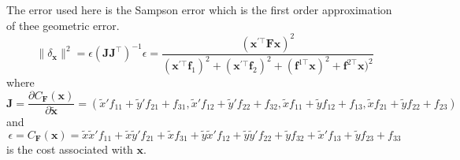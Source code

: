 \documentclass{../../assignment}
\begin{document}
\begin{problemlist}
\begin{enumerate}
The error used here is the Sampson error which is the first order approximation of thee geometric error.
$$
\|\delta_\mathbf{x}\|^2 = \epsilon(\mathbf{JJ}^{\top})^{-1}\epsilon = 
\frac{(\mathbf{x}^{'\top}\mathbf{F}\mathbf{x})^2}{(\mathbf{x^{'\top}f}_1)^2+(\mathbf{x^{'\top}f}_2)^2+(\mathbf{f}^{1\top}\mathbf{x})^2+\mathbf{f}^{2\top}\mathbf{x})^2}
$$
where 
$$\mathbf{J} = \frac{\partial C_{\mathbf{F}}(\mathbf{x})}{\partial \mathbf{\tilde{x}}} = 
(\tilde{x}'f_{11}+\tilde{y}'f_{21}+f_{31}, \tilde{x}'f_{12}+\tilde{y}'f_{22}+f_{32}, \tilde{x}f_{11}+\tilde{y}f_{12}+f_{13}, \tilde{x}f_{21}+\tilde{y}f_{22}+f_{23})
$$
and
$$\epsilon = C_{\mathbf{F}}(\mathbf{x}) = 
\tilde{x}\tilde{x}'f_{11} + \tilde{x}\tilde{y}'f_{21} + \tilde{x}f_{31} + \tilde{y}\tilde{x}'f_{12} + \tilde{y}\tilde{y}'f_{22} + \tilde{y}f_{32} + \tilde{x}'f_{13} + \tilde{y}f_{23} + f_{33}
$$ 
is the cost associated with $\mathbf{x}$.


\end{enumerate}
\end{problemlist}
\end{document}
